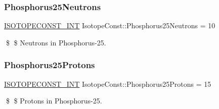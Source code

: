 \subsubsection{\texorpdfstring{Phosphorus25\+Neutrons}{Phosphorus25Neutrons}}
{\footnotesize\ttfamily \mbox{\hyperlink{group___isotope_const-_macros_ga5f18360b3e99483a35c32d789e62621c}{I\+S\+O\+T\+O\+P\+E\+C\+O\+N\+S\+T\+\_\+\+I\+NT}} Isotope\+Const\+::\+Phosphorus25\+Neutrons = 10}

\$ \$ Neutrons in Phosphorus-\/25. \mbox{\label{group___isotope_const-_phosphorus-_p25_ga80e4c9d7c91250db139273bf77041306}} 
\subsubsection{\texorpdfstring{Phosphorus25\+Protons}{Phosphorus25Protons}}
{\footnotesize\ttfamily \mbox{\hyperlink{group___isotope_const-_macros_ga5f18360b3e99483a35c32d789e62621c}{I\+S\+O\+T\+O\+P\+E\+C\+O\+N\+S\+T\+\_\+\+I\+NT}} Isotope\+Const\+::\+Phosphorus25\+Protons = 15}

\$ \$ Protons in Phosphorus-\/25. 